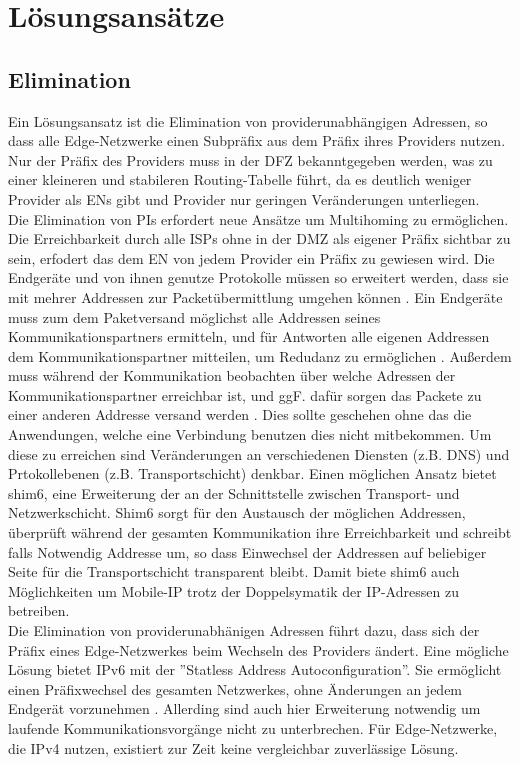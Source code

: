\section{Lösungsansätze}
\subsection{Elimination}
Ein Lösungsansatz ist die Elimination von providerunabhängigen Adressen, so dass alle Edge-Netzwerke einen Subpräfix aus dem Präfix ihres Providers nutzen. Nur der Präfix des Providers muss in der DFZ bekanntgegeben werden, was zu einer kleineren und stabileren Routing-Tabelle führt, da es deutlich weniger Provider als ENs gibt und Provider nur geringen Veränderungen unterliegen.\\

Die Elimination von PIs erfordert neue Ansätze um Multihoming zu ermöglichen. Die Erreichbarkeit durch alle ISPs ohne in der DMZ als eigener Präfix sichtbar zu sein, erfodert das dem EN von jedem Provider ein Präfix zu gewiesen wird. Die Endgeräte und von ihnen genutze Protokolle müssen so erweitert werden, dass sie mit mehrer Addressen zur Packetübermittlung umgehen können \cite{jen:2008:start}. Ein Endgeräte muss zum dem Paketversand möglichst alle Addressen seines Kommunikationspartners ermitteln, und für Antworten alle eigenen Addressen dem Kommunikationspartner mitteilen, um Redudanz zu ermöglichen \cite{jen:2008:start}. Außerdem muss während der Kommunikation beobachten über welche Adressen der Kommunikationspartner erreichbar ist, und ggF. dafür sorgen das Packete zu einer anderen Addresse versand werden \cite{jen:2008:start}. Dies sollte geschehen ohne das die Anwendungen, welche eine Verbindung benutzen dies nicht mitbekommen. Um diese zu erreichen sind Veränderungen an verschiedenen Diensten (z.B. DNS) und Prtokollebenen (z.B. Transportschicht) denkbar. Einen möglichen Ansatz bietet shim6\cite{nordmark:2009:RFC5533}, eine Erweiterung der an der Schnittstelle zwischen Transport- und Netzwerkschicht. Shim6 sorgt für den Austausch der möglichen Addressen, überprüft während der gesamten Kommunikation ihre Erreichbarkeit und schreibt falls Notwendig Addresse um, so dass Einwechsel der Addressen auf beliebiger Seite für die Transportschicht transparent bleibt. Damit biete shim6 auch Möglichkeiten um Mobile-IP trotz der Doppelsymatik der IP-Adressen zu betreiben. \\
 

Die Elimination von providerunabhänigen Adressen führt dazu, dass sich der Präfix eines Edge-Netzwerkes beim Wechseln des Providers ändert. Eine mögliche Lösung bietet IPv6 mit der ''Statless Address Autoconfiguration''. Sie ermöglicht einen Präfixwechsel des gesamten Netzwerkes, ohne Änderungen an jedem Endgerät vorzunehmen \cite{RFC4862}. Allerding sind auch hier Erweiterung notwendig um laufende Kommunikationsvorgänge nicht zu unterbrechen. Für Edge-Netzwerke, die IPv4 nutzen, existiert zur Zeit keine vergleichbar zuverlässige Lösung.\\

